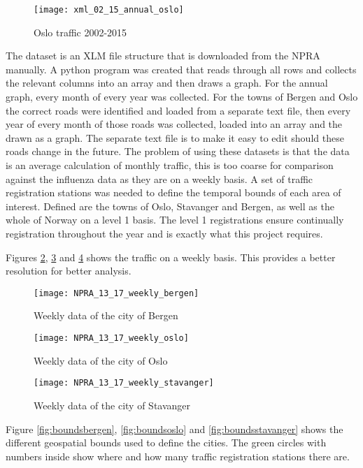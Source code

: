 \begin{figure}[ht]
\texttt{[image: xml\_02\_15\_annual\_oslo]}
\centering
\caption{Oslo traffic 2002-2015}
\label{fig:anualoslo}
\end{figure}
The dataset is an XLM file structure that is downloaded from the NPRA manually. A python program was created that reads through all rows and collects the relevant columns into an array and then draws a graph. For the annual graph, every month of every year was collected. For the towns of Bergen and Oslo the correct roads were identified and loaded from a separate text file, then every year of every month of those roads was collected, loaded into an array and the drawn as a graph. The separate text file is to make it easy to edit should these roads change in the future.
The problem of using these datasets is that the data is an average calculation of monthly traffic, this is too coarse for comparison against the influenza data as they are on a weekly basis. A set of traffic registration stations was needed to define the temporal bounds of each area of interest. Defined are the towns of Oslo, Stavanger and Bergen, as well as the whole of Norway on a level 1 basis. The level 1 registrations ensure continually registration throughout the year and is exactly what this project requires.

Figures \ref{fig:weeklybergen}, \ref{fig:weeklyoslo} and \ref{fig:weeklystavanger} shows the traffic on a weekly basis. This provides a better resolution for better analysis.
\begin{figure}[ht]
\texttt{[image: NPRA\_13\_17\_weekly\_bergen]}
\centering
\caption{Weekly data of the city of Bergen}
\label{fig:weeklybergen}
\end{figure}

\begin{figure}[ht]
\texttt{[image: NPRA\_13\_17\_weekly\_oslo]}
\centering
\caption{Weekly data of the city of Oslo}
\label{fig:weeklyoslo}
\end{figure}

\begin{figure}[ht]
\texttt{[image: NPRA\_13\_17\_weekly\_stavanger]}
\centering
\caption{Weekly data of the city of Stavanger}
\label{fig:weeklystavanger}
\end{figure}

Figure \ref{fig:boundsbergen}, \ref{fig:boundsoslo} and \ref{fig:boundsstavanger} shows the different geospatial bounds used to define the cities. The green circles with numbers inside show where and how many traffic registration stations there are.

